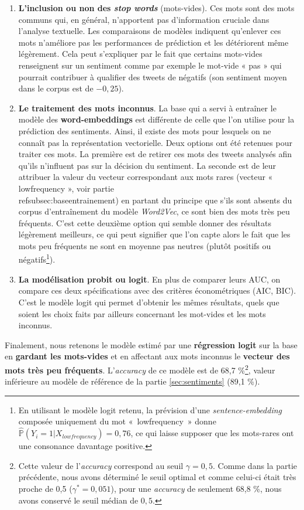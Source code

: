 \documentclass[11pt,french,french]{article}
\let\rmarkdownfootnote\footnote%
\def\footnote{\protect\rmarkdownfootnote}
\begin{document}
\begin{enumerate}
\item \textbf{L’inclusion ou non des \emph{stop words}} (mots-vides). 
Ces mots sont des mots communs qui, en général, n’apportent pas d’information cruciale dans l’analyse textuelle. Les comparaisons de modèles indiquent qu’enlever ces mots n’améliore pas les performances de prédiction et les détériorent même légèrement. Cela peut s’expliquer par le fait que certains mots-vides renseignent sur un sentiment comme par exemple le mot-vide « pas » qui pourrait contribuer à qualifier des tweets de négatifs (son sentiment moyen dans le corpus est de $-0,25$).

\item \textbf{Le traitement des mots inconnus}. La base qui a servi à entraîner le modèle des \textbf{word-embeddings} est différente de celle que l'on utilise pour la prédiction des sentiments.
Ainsi, il existe des mots pour lesquels on ne connaît pas la représentation vectorielle. 
Deux options ont été retenues pour traiter ces mots. 
La première est de retirer ces mots des tweets analysés afin qu'ils n’influent pas sur la décision du sentiment. 
La seconde est de leur attribuer la valeur du vecteur correspondant aux mots rares (vecteur « lowfrequency », voir partie \\ref{subsec:baseentrainement}) en partant du principe que s'ils sont absents du corpus d'entraînement du modèle \emph{Word2Vec}, ce sont bien des mots très peu fréquents. 
C’est cette deuxième option qui semble donner des résultats légèrement meilleurs, ce qui peut signifier que l’on capte alors le fait que les mots peu fréquents ne sont en moyenne pas neutres (plutôt positifs ou négatifs\footnote{En utilisant le modèle logit retenu, la prévision d'une \emph{sentence-embedding} composée uniquement du mot « lowfrequency » donne $\widehat{\mathbb{P}}(Y_i = 1 | X_{lowfrequency}) = 0,76$, ce qui laisse supposer que les mots-rares ont une consonance davantage positive.}). 

\item \textbf{La modélisation probit ou logit}. En plus de comparer leurs AUC, on compare ces deux spécifications avec des critères économétriques (AIC, BIC). C’est le modèle logit qui permet d’obtenir les mêmes résultats, quels que soient les choix faits par ailleurs concernant les mot-vides et les mots inconnus.
\end{enumerate}

Finalement, nous retenons le modèle estimé par une \textbf{régression logit} sur la base en \textbf{gardant les mots-vides} et en affectant aux mots inconnus le \textbf{vecteur des mots très peu fréquents}. L'\emph{accuracy} de ce modèle est de 68,7 \%\footnote{Cette valeur de l'\emph{accuracy} correspond au seuil \(\gamma = 0,5\). Comme dans la partie précédente, nous avons déterminé le seuil optimal et comme celui-ci était très proche de 0,5 (\(\gamma^* = 0,051\)), pour une \emph{accuracy} de seulement 68,8 \%, nous avons conservé le seuil médian de \(0,5\).}, valeur inférieure au modèle de référence de la partie \ref{sec:sentiments} (89,1 \%).
\end{document}
